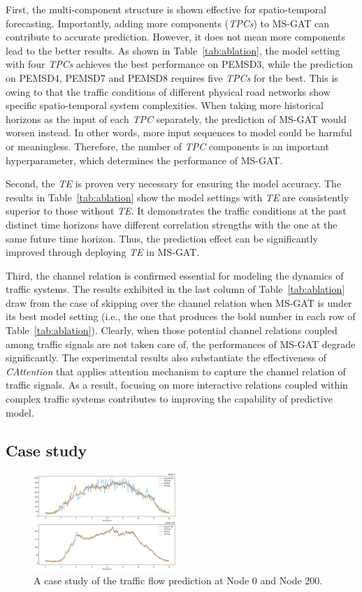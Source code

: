 First,  the multi-component structure is shown effective for spatio-temporal forecasting. Importantly, adding more components (\textit{TPCs})  to MS-GAT can contribute to accurate prediction. However, it does not mean  more components lead to the better results. As shown in Table~\ref{tab:ablation}, the model setting with four \textit{TPCs} achieves the best performance on PEMSD3, while the prediction on PEMSD4, PEMSD7 and PEMSD8 requires five \textit{TPCs} for the best. This is owing to that the traffic conditions of different physical road networks show specific spatio-temporal system complexities. When taking more historical horizons as the input of each \textit{TPC} separately, the prediction of MS-GAT would worsen instead. In other words, more input sequences to model could be harmful or meaningless. Therefore, the number of \textit{TPC} components is an important hyperparameter, which determines the performance of MS-GAT.

Second, the \textit{TE} is proven very necessary for ensuring the model accuracy. The  results in Table~\ref{tab:ablation} show the model settings with \textit{TE} are consistently superior to those without \textit{TE}. It demonstrates the traffic conditions at the past distinct time horizons have different correlation strengths with the one at the same future time horizon. Thus, the prediction effect can be significantly improved through deploying \textit{TE} in MS-GAT.

Third, the channel relation is confirmed essential for modeling the dynamics of traffic systems. The results exhibited in the last column of Table~\ref{tab:ablation} draw from the case of skipping over the channel relation when MS-GAT is under its best model setting (i.e., the one that produces the bold number in each row of Table~\ref{tab:ablation}). Clearly, when those potential channel relations coupled among traffic signals are not taken care of, the performances of MS-GAT degrade significantly. The experimental results also substantiate the effectiveness of \textit{CAttention} that applies attention mechanism to capture the channel relation of traffic signals. As a result, focusing on more interactive relations coupled within complex traffic systems contributes to improving the capability of predictive model.

\subsection{Case study}

\begin{figure}[!ht]
    \centering
    \includegraphics[width=0.48\textwidth]{pictures/Case_1.png}
    \caption{A case study of the traffic flow prediction at Node 0 and Node 200.}
    \label{fig:case_1}
\end{figure}

